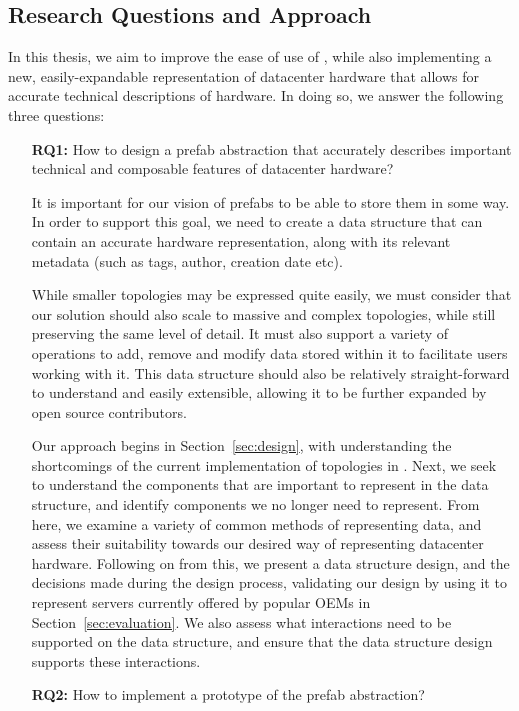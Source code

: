 \documentclass[11pt]{article}
\begin{document}
	\subsection{Research Questions and Approach}
		In this thesis, we aim to improve the ease of use of \opendc{}, while also implementing a new, easily-expandable representation of datacenter hardware that allows for accurate technical descriptions of hardware. 
		In doing so, we answer the following three questions:
		\begin{itemize}
			\item [\textbf{RQ1:}] How to design a prefab abstraction that accurately describes important technical and composable features of datacenter hardware?

			It is important for our vision of prefabs to be able to store them in some way.
			In order to support this goal, we need to create a data structure that can contain an accurate hardware representation, along with its relevant metadata (such as tags, author, creation date etc).

			While smaller topologies may be expressed quite easily, we must consider that our solution should also scale to massive and complex topologies, while still preserving the same level of detail.
			It must also support a variety of operations to add, remove and modify data stored within it to facilitate users working with it.
			This data structure should also be relatively straight-forward to understand and easily extensible, allowing it to be further expanded by open source contributors.

			Our approach begins in Section~\ref{sec:design}, with understanding the shortcomings of the current implementation of topologies in \opendc{}.
			Next, we seek to understand the components that are important to represent in the data structure, and identify components we no longer need to represent.
			From here, we examine a variety of common methods of representing data, and assess their suitability towards our desired way of representing datacenter hardware.
			Following on from this, we present a data structure design, and the decisions made during the design process, validating our design by using it to represent servers currently offered by popular OEMs in Section~\ref{sec:evaluation}.
			We also assess what interactions need to be supported on the data structure, and ensure that the data structure design supports these interactions.

			\item [\textbf{RQ2:}] How to implement a prototype of the prefab abstraction?


\end{itemize}
\end{document}
